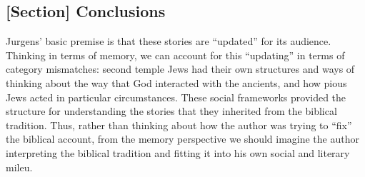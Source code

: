 \subsection{[Section] Conclusions}

Jurgens' basic premise is that these stories are ``updated'' for its audience. Thinking in terms of memory, we can account for this ``updating'' in terms of category mismatches: second temple Jews had their own structures and ways of thinking about the way that God interacted with the ancients, and how pious Jews acted in particular circumstances. These social frameworks provided the structure for understanding the stories that they inherited from the biblical tradition. Thus, rather than thinking about how the author was trying to ``fix'' the biblical account, from the memory perspective we should imagine the author interpreting the biblical tradition and fitting it into his own social and literary mileu.
